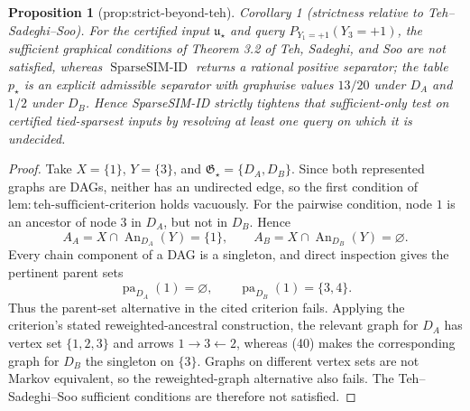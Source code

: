 \documentclass{article}
\newtheorem{proposition}{Proposition}
\begin{document}
\begin{proposition}[prop:strict-beyond-teh]\label{prop:strict-beyond-teh}
Corollary 1 (strictness relative to Teh--Sadeghi--Soo). For the certified input \(\mathfrak u_{\star}\) and query \(P_{Y_1=+1}(Y_3=+1)\), the sufficient graphical conditions of Theorem 3.2 of Teh, Sadeghi, and Soo are not satisfied, whereas \(\operatorname{SparseSIM\text{-}ID}\) returns a rational positive separator; the table \(p_{\star}\) is an explicit admissible separator with graphwise values \(13/20\) under \(D_A\) and \(1/2\) under \(D_B\). Hence SparseSIM-ID strictly tightens that sufficient-only test on certified tied-sparsest inputs by resolving at least one query on which it is undecided.
\end{proposition}
\begin{proof}
Take \(X=\{1\}\), \(Y=\{3\}\), and \(\mathfrak G_\star=\{D_A,D_B\}\).  Since both represented graphs are DAGs, neither has an undirected edge, so the first condition of \(\mathrm{lem{:}teh\text{-}sufficient\text{-}criterion}\) holds vacuously.  For the pairwise condition, node \(1\) is an ancestor of node \(3\) in \(D_A\), but not in \(D_B\).  Hence
\[
 A_A=X\cap\operatorname{An}_{D_A}(Y)=\{1\},
 \qquad
 A_B=X\cap\operatorname{An}_{D_B}(Y)=\varnothing. \tag{40}
\]
Every chain component of a DAG is a singleton, and direct inspection gives the pertinent parent sets
\[
 \operatorname{pa}_{D_A}(1)=\varnothing,
 \qquad
 \operatorname{pa}_{D_B}(1)=\{3,4\}. \tag{41}
\]
Thus the parent-set alternative in the cited criterion fails.  Applying the criterion's stated reweighted-ancestral construction, the relevant graph for \(D_A\) has vertex set \(\{1,2,3\}\) and arrows \(1\to3\leftarrow2\), whereas (40) makes the corresponding graph for \(D_B\) the singleton on \(\{3\}\).  Graphs on different vertex sets are not Markov equivalent, so the reweighted-graph alternative also fails.  The Teh--Sadeghi--Soo sufficient conditions are therefore not satisfied.


\end{proof}
\end{document}
